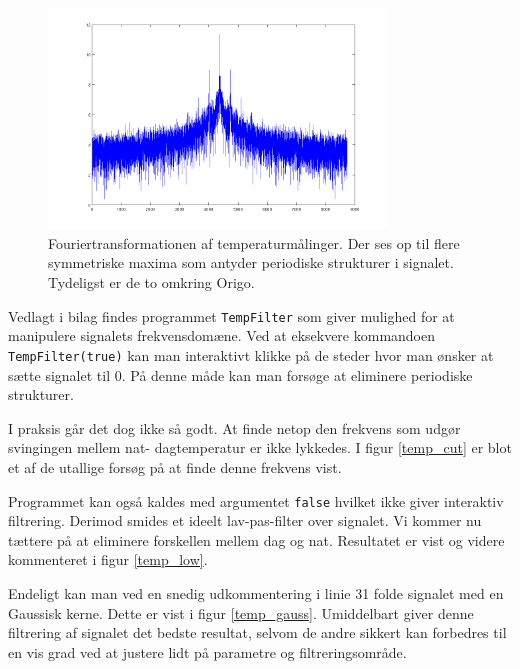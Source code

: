 \documentclass[a4paper, 10pt, danish, final]{article}
\begin{document}
\begin{figure}[!h]
    \centering
    \includegraphics[angle=0,width=0.80\textwidth]{images/ftemp}
    \caption[]{Fouriertransformationen af temperaturmålinger. Der ses op
    til flere symmetriske maxima som antyder periodiske strukturer i
    signalet. Tydeligst er de to omkring Origo.}
    \label{ftemp}
\end{figure}

Vedlagt i bilag findes programmet \texttt{TempFilter} som giver mulighed
for at manipulere signalets frekvensdomæne. Ved at eksekvere kommandoen
\texttt{TempFilter(true)} kan man interaktivt klikke på de steder hvor
man ønsker at sætte signalet til 0. På denne måde kan man forsøge at
eliminere periodiske strukturer.

I praksis går det dog ikke så godt. At finde netop den frekvens som
udgør svingingen mellem nat- dagtemperatur er ikke lykkedes. I figur
\ref{temp_cut} er blot et af de utallige forsøg på at finde denne
frekvens vist.

Programmet kan også kaldes med argumentet \texttt{false} hvilket ikke
giver interaktiv filtrering. Derimod smides et ideelt lav-pas-filter
over signalet. Vi kommer nu tættere på at eliminere forskellen mellem
dag og nat. Resultatet er vist og videre kommenteret i figur
\ref{temp_low}.

Endeligt kan man ved en snedig udkommentering i linie 31 folde signalet
med en Gaussisk kerne. Dette er vist i figur \ref{temp_gauss}.
Umiddelbart giver denne filtrering af signalet det bedste resultat,
selvom de andre sikkert kan forbedres til en vis grad ved at justere
lidt på parametre og filtreringsområde.
\end{document}
